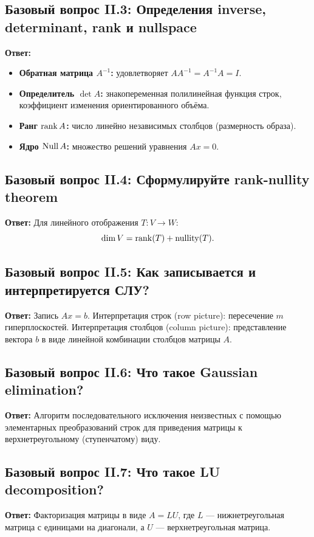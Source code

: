 \subsection{Базовый вопрос II.3: Определения inverse, determinant, rank и nullspace}
\textbf{Ответ:}
\begin{itemize}
    \item \textbf{Обратная матрица $A^{-1}$:} удовлетворяет $A A^{-1} = A^{-1} A = I$.
    \item \textbf{Определитель $\det A$:} знакопеременная полилинейная функция строк, коэффициент изменения
    ориентированного объёма.
    \item \textbf{Ранг $\operatorname{rank} A$:} число линейно независимых столбцов (размерность образа).
    \item \textbf{Ядро $\operatorname{Null} A$:} множество решений уравнения $Ax = 0$.
\end{itemize}

\subsection{Базовый вопрос II.4: Сформулируйте rank-nullity theorem}
\textbf{Ответ:} Для линейного отображения $T \colon V \to W$:
\[ \dim V = \operatorname{rank}(T) + \operatorname{nullity}(T). \]

\subsection{Базовый вопрос II.5: Как записывается и интерпретируется СЛУ?}
\textbf{Ответ:} Запись $Ax = b$.
Интерпретация строк (row picture): пересечение $m$ гиперплоскостей.
Интерпретация столбцов (column picture): представление вектора $b$ в виде линейной комбинации столбцов матрицы $A$.

\subsection{Базовый вопрос II.6: Что такое Gaussian elimination?}
\textbf{Ответ:} Алгоритм последовательного исключения неизвестных с помощью элементарных преобразований строк для
приведения матрицы к верхнетреугольному (ступенчатому) виду.

\subsection{Базовый вопрос II.7: Что такое LU decomposition?}
\textbf{Ответ:} Факторизация матрицы в виде $A = LU$, где $L$ — нижнетреугольная матрица с единицами на диагонали, а $U$
— верхнетреугольная матрица.

